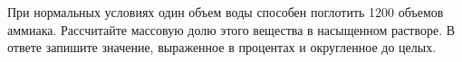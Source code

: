 
При нормальных условиях один объем воды способен поглотить 1200 объемов аммиака. Рассчитайте массовую долю этого вещества в насыщенном растворе. В ответе запишите значение, выраженное в процентах и округленное до целых.




